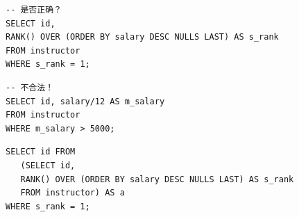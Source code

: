 \documentclass[aspectratio=169, 14pt]{beamer}
\begin{document}
\begin{frame}[fragile]

    \begin{verbatim}
-- 是否正确？
SELECT id,
RANK() OVER (ORDER BY salary DESC NULLS LAST) AS s_rank
FROM instructor
WHERE s_rank = 1;
    \end{verbatim}

    \pause

    \begin{verbatim}
-- 不合法！
SELECT id, salary/12 AS m_salary
FROM instructor
WHERE m_salary > 5000;
    \end{verbatim}

\end{frame}

\begin{frame}[fragile]

    \begin{verbatim}
SELECT id FROM 
   (SELECT id, 
   RANK() OVER (ORDER BY salary DESC NULLS LAST) AS s_rank
   FROM instructor) AS a
WHERE s_rank = 1;
    \end{verbatim}
    

\end{frame}
\end{document}
